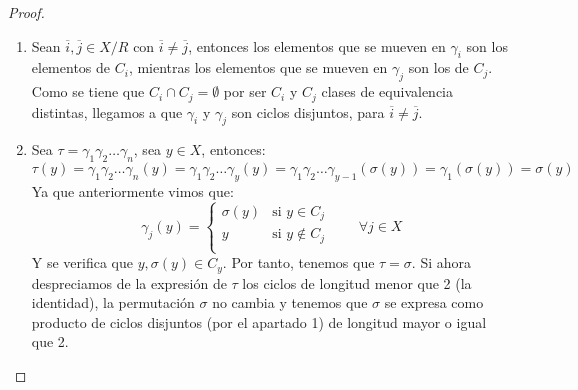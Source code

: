 \begin{teo}
\begin{proof}
        \begin{enumerate}
            \item Sean $\overline{i},\overline{j}\in X/R$ con $\overline{i}\neq \overline{j}$, entonces los elementos que se mueven en $\gamma_i$ son los elementos de $C_i$, mientras los elementos que se mueven en $\gamma_j$ son los de $C_j$. Como se tiene que $C_i\cap C_j = \emptyset $ por ser $C_i$ y $C_j$ clases de equivalencia distintas, llegamos a que $\gamma_i$ y $\gamma_j$ son ciclos disjuntos, para $\overline{i}\neq \overline{j}$.
            \item Sea $\tau = \gamma_1\gamma_2\ldots\gamma_n$, sea $y\in X$, entonces:
                \begin{equation*}
                    \tau(y) = \gamma_1\gamma_2\ldots\gamma_n(y) = \gamma_1\gamma_2\ldots\gamma_y(y) = \gamma_1\gamma_2\ldots\gamma_{y-1}(\sigma(y)) = \gamma_1(\sigma(y)) = \sigma(y)
                \end{equation*}
                Ya que anteriormente vimos que:
                \begin{equation*}
                    \gamma_j(y) = \left\{\begin{array}{cr}
                            \sigma(y) & \text{si\ } y\in C_j \\
                            y & \text{si\ } y\notin C_j \\
                    \end{array}\right. \qquad \forall j\in X
                \end{equation*}
                Y se verifica que $y,\sigma(y)\in C_y$. Por tanto, tenemos que $\tau = \sigma$. Si ahora despreciamos de la expresión de $\tau$ los ciclos de longitud menor que 2 (la identidad), la permutación $\sigma$ no cambia y tenemos que $\sigma$ se expresa como producto de ciclos disjuntos (por el apartado 1) de longitud mayor o igual que 2.\qedhere
        \end{enumerate}
    \end{proof}
\end{teo}

